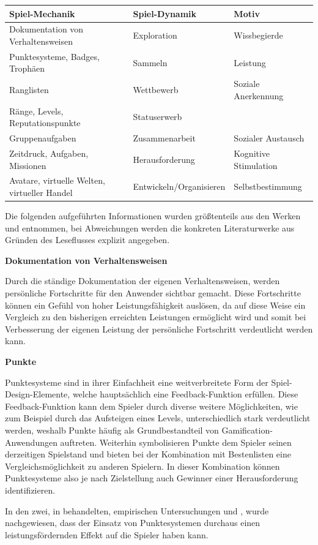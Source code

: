 \documentclass[bibliography=totoc,listof=totoc,BCOR=5mm,DIV=12,oneside]{scrbook}
\begin{document}
\bigskip
\begin{tabularx}{\textwidth}{X|l|l}
	\toprule
	\textbf{Spiel-Mechanik} & \textbf{Spiel-Dynamik} & \textbf{Motiv}\\ \midrule
	Dokumentation von Verhaltensweisen & Exploration & Wissbegierde\\
	Punktesysteme, Badges, Trophäen & Sammeln  & Leistung\\
	Ranglisten & Wettbewerb & Soziale Anerkennung\\ 
	Ränge, Levels, Reputationspunkte & Statuserwerb  & \\
	Gruppenaufgaben & Zusammenarbeit  & Sozialer Austausch\\
	Zeitdruck, Aufgaben, Missionen & Herausforderung & Kognitive Stimulation\\ 
	Avatare, virtuelle Welten, virtueller Handel & Entwickeln/Organisieren & Selbstbestimmung \\ 
	\bottomrule
\end{tabularx}
\label{tab:spielDesignElemente}

\par \bigskip Die folgenden aufgeführten Informationen wurden größtenteils aus den Werken \citep[Kapitel 2.2.2 Analyse einzelner Spiel-Design-Elemente]{Sailer2016} und \citep[Kapitel 4 The Gamification Toolkit Game Elements]{werbach2012win} entnommen, bei Abweichungen werden die konkreten Literaturwerke aus Gründen des Leseflusses explizit angegeben.

\par \bigskip \textbf{Dokumentation von Verhaltensweisen}
\par Durch die ständige Dokumentation der eigenen Verhaltensweisen, werden persönliche Fortschritte für den Anwender sichtbar gemacht. Diese Fortschritte können ein Gefühl von hoher Leistungsfähigkeit auslösen, da auf diese Weise ein Vergleich zu den bisherigen erreichten Leistungen ermöglicht wird und somit bei Verbesserung der eigenen Leistung der persönliche Fortschritt verdeutlicht werden kann.

\par \bigskip \textbf{Punkte}
\par Punktesysteme sind in ihrer Einfachheit eine weitverbreitete Form der Spiel-Design-Elemente, welche hauptsächlich eine Feedback-Funktion erfüllen. Diese Feedback-Funktion kann dem Spieler durch diverse weitere Möglichkeiten, wie zum Beispiel durch das Aufsteigen eines Levels, unterschiedlich stark verdeutlicht werden, weshalb Punkte häufig als Grundbestandteil von Gamification-Anwendungen auftreten. Weiterhin symbolisieren Punkte dem Spieler seinen derzeitigen Spielstand und bieten bei der Kombination mit Bestenlisten eine Vergleichsmöglichkeit zu anderen Spielern. In dieser Kombination können Punktesysteme also je nach Zielstellung auch Gewinner einer Herausforderung identifizieren.
\par In den zwei, in \citep{Sailer2016} behandelten, empirischen Untersuchungen \citep{mekler2013disassembling} und \citep{mekler2013points}, wurde nachgewiesen, dass der Einsatz von Punktesystemen durchaus einen leistungsfördernden Effekt auf die Spieler haben kann.
\end{document}
